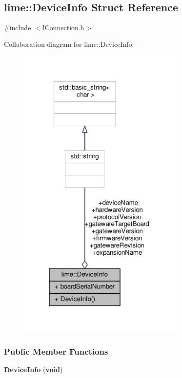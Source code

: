 \subsection{lime\+:\+:Device\+Info Struct Reference}
\label{structlime_1_1DeviceInfo}


{\ttfamily \#include $<$I\+Connection.\+h$>$}



Collaboration diagram for lime\+:\+:Device\+Info\+:
\nopagebreak
\begin{figure}[H]
\begin{center}
\leavevmode
\includegraphics[width=235pt]{dd/d51/structlime_1_1DeviceInfo__coll__graph}
\end{center}
\end{figure}
\subsubsection*{Public Member Functions}
\begin{DoxyCompactItemize}
\item 
{\bf Device\+Info} ({\bf void})
\end{DoxyCompactItemize}
